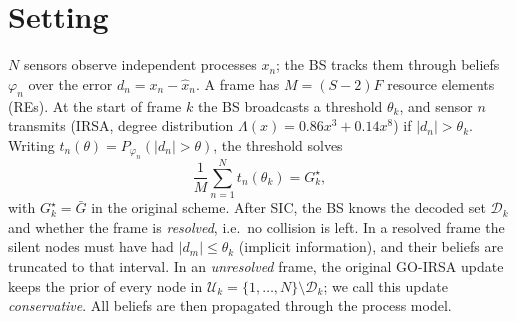 \documentclass[10pt]{article}
\theoremstyle{remark}
\theoremstyle{definition}
\newcommand{\Gb}{\bar G}
\newcommand{\Dset}{\mathcal D}
\newcommand{\Uset}{\mathcal U}
\begin{document}
\section{Setting}
$N$ sensors observe independent processes $x_n$; the BS tracks them through beliefs
$\varphi_n$ over the error $d_n = x_n - \hat x_n$. A frame has $M=(S-2)F$ resource
elements (REs). At the start of frame $k$ the BS broadcasts a threshold $\theta_k$, and
sensor $n$ transmits (IRSA, degree distribution $\Lambda(x)=0.86x^3+0.14x^8$) if
$|d_n|>\theta_k$. Writing $t_n(\theta) = P_{\varphi_n}(|d_n|>\theta)$, the threshold
solves
\begin{equation}
  \label{eq:threshold}
  \frac1M\sum_{n=1}^N t_n(\theta_k) = G_k^{\star},
\end{equation}
with $G_k^\star = \Gb$ in the original scheme. After SIC, the BS knows the decoded set
$\Dset_k$ and whether the frame is \emph{resolved}, i.e.\ no collision is left. In a resolved frame the silent
nodes must have had $|d_m|\le\theta_k$ (implicit information), and their beliefs are
truncated to that interval. In an \emph{unresolved} frame, the original GO-IRSA update
keeps the prior of every node in $\Uset_k = \{1,\dots,N\}\setminus\Dset_k$; we call
this update \emph{conservative}. All beliefs are then propagated through the process model.

\end{document}
